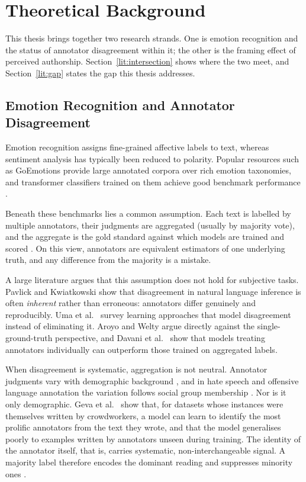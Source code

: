 \chapter{Theoretical Background}
\label{c:literature}

\noindent
This thesis brings together two research strands. One is emotion recognition and the status of
annotator disagreement within it; the other is the framing effect of perceived authorship.
Section~\ref{lit:intersection} shows where the two meet, and Section~\ref{lit:gap} states the gap
this thesis addresses.

\section{Emotion Recognition and Annotator Disagreement}
\label{lit:disagreement}

\noindent
Emotion recognition assigns fine-grained affective labels to text, whereas sentiment analysis
has typically been reduced to polarity. Popular resources such as GoEmotions
\cite{Demszky2020GoEmotions} provide large annotated corpora over rich emotion taxonomies, and transformer classifiers trained on them achieve good
benchmark performance \cite{Acheampong2021EmotionReview}.

Beneath these benchmarks lies a common assumption. Each text is labelled by multiple annotators,
their judgments are aggregated (usually by majority vote), and the aggregate is the gold standard
against which models are trained and scored \cite{Basile2020GoldStandard}. On this view,
annotators are equivalent estimators of one underlying truth, and any difference from the
majority is a mistake.

A large literature argues that this assumption does not hold for subjective tasks.
Pavlick and Kwiatkowski \citeyear{Pavlick2019InherentDisagreement} show that disagreement in
natural language inference is often \emph{inherent} rather than erroneous: annotators differ
genuinely and reproducibly. Uma et al.\ \citeyear{Uma2021Survey} survey learning approaches that
model disagreement instead of eliminating it. Aroyo and Welty \citeyear{Aroyo2015CrowdTruth}
argue directly against the single-ground-truth perspective, and Davani et al.\
\citeyear{Davani2022Disagreement} show that models treating annotators individually can
outperform those trained on aggregated labels.

When disagreement is systematic, aggregation is not neutral. Annotator judgments vary with
demographic background \cite{Prabhakaran2021AnnotatorMetadata}, and in hate speech and
offensive language annotation the variation follows social group membership \cite{Sap2019RacialBias,
Waseem2016AnnotatorInfluence}. Nor is it only demographic. Geva et al.\
\citeyear{Geva2019AnnotatorBias} show that, for datasets whose instances were themselves written
by crowdworkers, a model can learn to identify the most prolific annotators from the text they
wrote, and that the model generalises poorly to examples written by annotators unseen during
training. The identity of the annotator itself, that is, carries systematic, non-interchangeable
signal. A majority label therefore encodes the dominant reading and suppresses minority ones
\cite{Davani2022Disagreement}.

